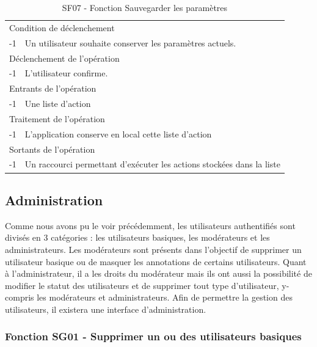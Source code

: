 \documentclass[a4paper]{article}
\begin{document}
\begin{table}[H]
  \centering
   \small
	\begin{tabular}{|c|p{12cm}|}
   		\hline
   			\rowcolor{lightgray}\multicolumn{2}{|c|}{\textbf{SF07 - Fonction Sauvegarder les paramètres}} \\
   		\hline
   			\multicolumn{2}{|l|}{Condition de d\'eclenchement} \\
   		\hline
   			-1 & Un utilisateur souhaite conserver les paramètres actuels. \\
   		\hline
   			\multicolumn{2}{|l|}{D\'eclenchement de l'op\'eration} \\
   		\hline
   			-1 & L'utilisateur confirme. \\
   		\hline
   			\multicolumn{2}{|l|}{Entrants de l'op\'eration} \\
   		\hline
        	-1 & Une liste d'action \\ 	
        \hline
   			\multicolumn{2}{|l|}{Traitement de l'op\'eration} \\
  		\hline
   			-1 & L'application conserve en local cette liste d'action \\
   		\hline
   			\multicolumn{2}{|l|}{Sortants de l'op\'eration} \\
   		\hline
   			-1 & Un raccourci permettant d'exécuter les actions stockées dans la liste \\
   		\hline
	\end{tabular}
  \caption{SF07 - Fonction Sauvegarder les paramètres}
  \normalsize
  \label{tab:visu_img_save_parameters}
\end{table}

\subsection{Administration}

Comme nous avons pu le voir précédemment, les utilisateurs authentifiés sont divisés en 3 catégories : les utilisateurs basiques, les modérateurs et les administrateurs. Les modérateurs sont présents dans l'objectif de supprimer un utilisateur basique ou de masquer les annotations de certains utilisateurs. Quant à l'administrateur, il a les droits du modérateur mais ils ont aussi la possibilité de modifier le statut des utilisateurs et de supprimer tout type d'utilisateur, y-compris les modérateurs et administrateurs. Afin de permettre la gestion des utilisateurs, il existera une interface d'administration.

\subsubsection{Fonction SG01 - Supprimer un ou des utilisateurs basiques}
\end{document}
